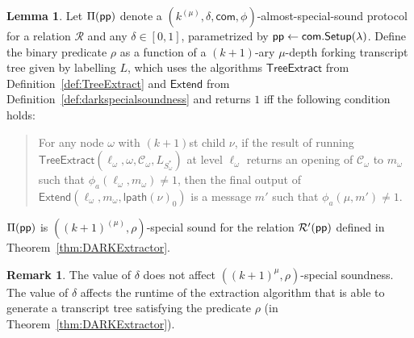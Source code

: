 \documentclass{article}
\theoremstyle{definition}
\newtheorem{lemma}{Lemma}
\newtheorem{remark}{Remark}
\begin{document}
\begin{lemma} \label{lem:DARKExtractor}
Let $\Pi(\textsf{pp})$ denote a $(k^{(\mu)}, \delta, \textsf{com}, \phi)$-almost-special-sound protocol for a relation $\mathcal{R}$ and any $\delta \in [0,1]$, parametrized by $\textsf{pp} \gets \textsf{com}.\textsf{{Setup}}(\lambda)$. Define the binary predicate $\rho$ as a function of a $(k+1)$-ary $\mu$-depth forking transcript tree given by labelling $L$, which uses the algorithms $\textsf{TreeExtract}$ from Definition~\ref{def:TreeExtract} and $\textsf{Extend}$ from Definition~\ref{def:darkspecialsoundness} and returns $1$ iff the following condition holds: 

\begin{quote} For any node $\omega$ with $(k+1)$st child $\nu$, if the result of running $\textsf{TreeExtract}(\ell_\omega, \omega, \mathcal{C}_\omega, L_{S^*_\omega})$ at level $\ell_\omega$ returns an opening of $\mathcal{C}_\omega$ to $m_\omega$ such that $\phi_a(\ell_\omega, m_\omega) \neq 1$, then the final output of $\textsf{Extend}(\ell_\omega, m_\omega, \textsf{lpath}(\nu)_0)$ is a message $m'$ such that $\phi_a(\mu, m') \neq 1$. 	
\end{quote}


$\Pi(\textsf{pp})$ is $((k+1)^{(\mu)}, \rho)$-special sound for the relation $\mathcal{R}'(\textsf{pp})$ defined in Theorem~\ref{thm:DARKExtractor}. 
 	
\end{lemma}
\begin{remark}
 The value of $\delta$ does not affect $((k+1)^\mu, \rho)$-special soundness. The value of $\delta$ affects the runtime of the extraction algorithm that is able to generate a transcript tree satisfying the predicate $\rho$ (in Theorem~\ref{thm:DARKExtractor}). 
\end{remark}
\end{document}
